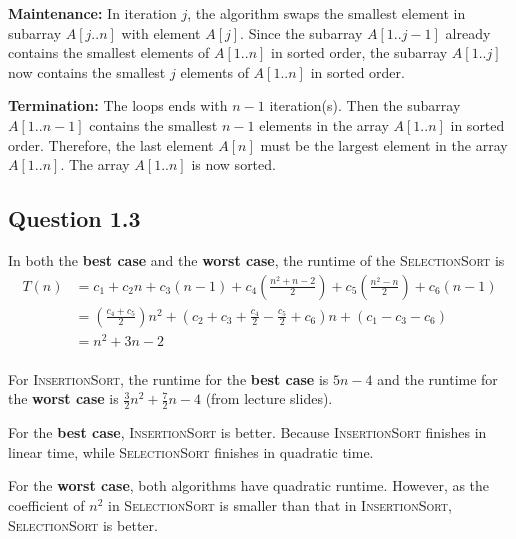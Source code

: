\documentclass{ctexart}
\begin{document}
\textbf{Maintenance:} In iteration $j$, the algorithm swaps the smallest element in subarray $A[j..n]$ with element $A[j]$. 
Since the subarray $A[1..j-1]$ already contains the smallest elements of $A[1..n]$ in sorted order, the subarray $A[1..j]$ now contains the smallest $j$ elements of $A[1..n]$ in sorted order.

\textbf{Termination:} The loops ends with $n - 1$ iteration(s). 
Then the subarray $A[1..n-1]$ contains the smallest $n - 1$ elements in the array $A[1..n]$ in sorted order. 
Therefore, the last element $A[n]$ must be the largest element in the array $A[1..n]$. 
The array $A[1..n]$ is now sorted.

\subsection*{Question 1.3}

\begin{center}
\end{center}

In both the \textbf{best case} and the \textbf{worst case}, the runtime of the \textsc{SelectionSort} is 
\begin{align*}
    T(n) &= c_1 + c_2n + c_3(n-1) + c_4(\frac{n^2+n-2}{2}) + c_5(\frac{n^2-n}{2}) + c_6(n-1)\\
         &= (\frac{c_4+c_5}{2})n^2 + (c_2+c_3+\frac{c_4}{2}-\frac{c_5}{2}+c_6)n + (c_1-c_3-c_6)\\
         &= n^2 + 3n - 2\\
\end{align*}

For \textsc{InsertionSort}, the runtime for the \textbf{best case} is $5n-4$ and the runtime for the \textbf{worst case} is $\frac{3}{2}n^2+\frac{7}{2}n-4$ (from lecture slides).

For the \textbf{best case}, \textsc{InsertionSort} is better. 
Because \textsc{InsertionSort} finishes in linear time, while \textsc{SelectionSort} finishes in quadratic time.

For the \textbf{worst case}, both algorithms have quadratic runtime. 
However, as the coefficient of $n^2$ in \textsc{SelectionSort} is smaller than that in \textsc{InsertionSort}, \textsc{SelectionSort} is better.
\end{document}
